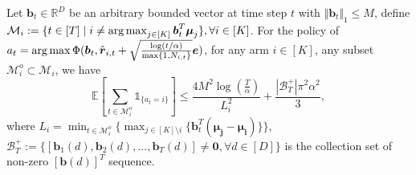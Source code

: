 \begin{proposition}
\label{prop: N_known_changing}
Let $\boldsymbol{b}_t \in \mathbb{R}^D$ be an arbitrary bounded vector at time step $t$ with $\Vert \boldsymbol{b}_t \Vert_1 \leq M$, define $\mathcal{M}_i := \{ t \in [T] \mid i \neq \operatorname*{arg\,max}_{j \in [K]} \boldsymbol{b}_t^T \boldsymbol{\mu}_j \}, \forall i \in [K]$. For the policy of $a_t = \operatorname*{arg\,max} \Phi ( \boldsymbol{b}_t, \hat{\boldsymbol{r}}_{i,t}+\sqrt{\frac{\log(t/\alpha)}{\max \{1, N_{i, t } \} }} \boldsymbol{e})$, for any arm $i \in [K]$, any subset $\mathcal{M}^{o}_i \subset \mathcal{M}_i$, we have
\[
\mathbb{E} \left[ \sum_{t \in \mathcal{M}^{o}_i} \mathds{1}_{\{a_t = i \} } \right] 
\leq
\frac{4 M^2 \log{(\frac{T}{\alpha})}}{L_i^2}
+
\frac{ |\mathcal{B}^{+}_{T}| \pi^2 \alpha^2} {3},
\]
where $L_i = \min_{t \in \mathcal{M}^{o}_i} \{ \max_{j \in [K] \setminus i } \{\boldsymbol{b}_t^T (\boldsymbol{\boldsymbol{\mu}_j - \boldsymbol{\mu}_{i}
} )\} \}$, $\mathcal{B}^{+}_{T} := \{{[\boldsymbol{b}_{1}(d), \boldsymbol{b}_{2}(d), ..., \boldsymbol{b}_{T}(d)]} \neq \boldsymbol{0}, \forall d \in [D]\}$ is the collection set of non-zero $[\boldsymbol{b}(d)]^T$ sequence. 
\end{proposition}

